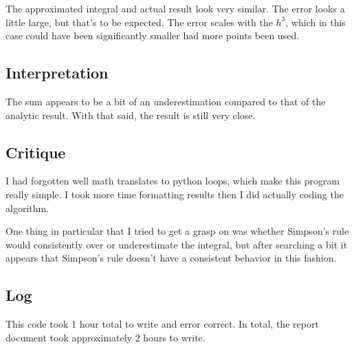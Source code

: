 \documentclass[10pt,letter]{article}
\begin{document}
The approximated integral and actual result look very similar. The error looks a little large, but that's to be expected. The error scales with the $h^3$, which in this case could have been significantly smaller had more points been used.

\subsection{Interpretation}

The sum appears to be a bit of an underestimation compared to that of the analytic result. With that said, the result is still very close.

\subsection{Critique}

I had forgotten well math translates to python loops, which make this program really simple. I took more time formatting results then I did actually coding the algorithm.

One thing in particular that I tried to get a grasp on was whether Simpson's rule would consistently over or underestimate the integral, but after searching a bit it appears that Simpson's rule doesn't have a consistent behavior in this fashion.

\subsection{Log}

This code took 1 hour total to write and error correct. In total, the report document took approximately 2 hours to write.
\end{document}
